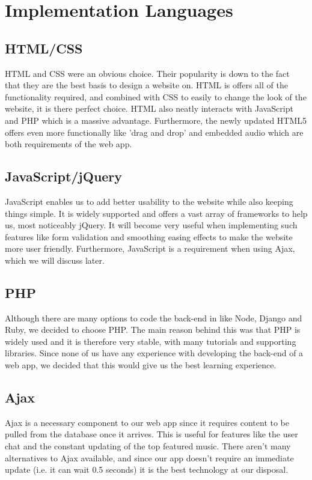 \documentclass{article}
\begin{document}
\section{Implementation Languages}

\subsection{HTML/CSS}
HTML and CSS were an obvious choice. Their popularity is down to the fact that they are the best basis to design a website on. HTML is offers all of the functionality required, and combined with CSS to easily to change the look of the website, it is there perfect choice. HTML also neatly interacts with JavaScript and PHP which is a massive advantage. Furthermore, the newly updated HTML5 offers even more functionally like 'drag and drop' and embedded audio which are both requirements of the web app.

\subsection{JavaScript/jQuery}
JavaScript enables us to add better usability to the website while also keeping things simple. It is widely supported and offers a vast array of frameworks to help us, most noticeably jQuery. It will become very useful when implementing such features like form validation and smoothing easing effects to make the website more user friendly. Furthermore, JavaScript is a requirement when using Ajax, which we will discuss later.

\subsection{PHP}
Although there are many options to code the back-end in like Node, Django and Ruby, we decided to choose PHP. The main reason behind this was that PHP is widely used and it is therefore very stable, with many tutorials and supporting libraries. Since none of us have any experience with  developing the back-end of a web app, we decided that this would give us the best learning experience.

\subsection{Ajax}
Ajax is a necessary component to our web app since it requires content to be pulled from the database once it arrives. This is useful for features like the user chat and the constant updating of the top featured music. There aren't many alternatives to Ajax available, and since our app doesn't require an immediate update (i.e. it can wait 0.5 seconds) it is the best technology at our disposal.
\end{document}
